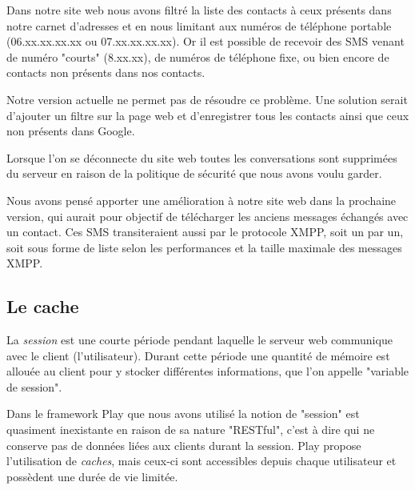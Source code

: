 Dans notre site web nous avons filtré la liste des contacts à ceux présents dans notre carnet d'adresses et en nous limitant aux numéros de téléphone portable (06.xx.xx.xx.xx ou 07.xx.xx.xx.xx).
Or il est possible de recevoir des SMS venant de numéro "courts" (8.xx.xx), de numéros de téléphone fixe, ou bien encore de contacts non présents dans nos contacts.

Notre version actuelle ne permet pas de résoudre ce problème.
Une solution serait d'ajouter un filtre sur la page web et d'enregistrer tous les contacts ainsi que ceux non présents dans Google.



Lorsque l'on se déconnecte du site web toutes les conversations sont supprimées du serveur en raison de la politique de sécurité que nous avons voulu garder.

Nous avons pensé apporter une amélioration à notre site web dans la prochaine version, qui aurait pour objectif de télécharger les anciens messages échangés avec un contact.
Ces SMS transiteraient aussi par le protocole XMPP, soit un par un, soit sous forme de liste selon les performances et la taille maximale des messages XMPP.




\subsection{Le cache}

La \textit{session} est une courte période pendant laquelle le serveur web communique avec le client (l'utilisateur).
Durant cette période une quantité de mémoire est allouée au client pour y stocker différentes informations, que l'on appelle "variable de session".

Dans le framework Play que nous avons utilisé la notion de "session" est quasiment inexistante en raison de sa nature "RESTful", c'est à dire qui ne conserve pas de données liées aux clients durant la session.
Play propose l'utilisation de \textit{caches}, mais ceux-ci sont accessibles depuis chaque utilisateur et possèdent une durée de vie limitée.
\\


